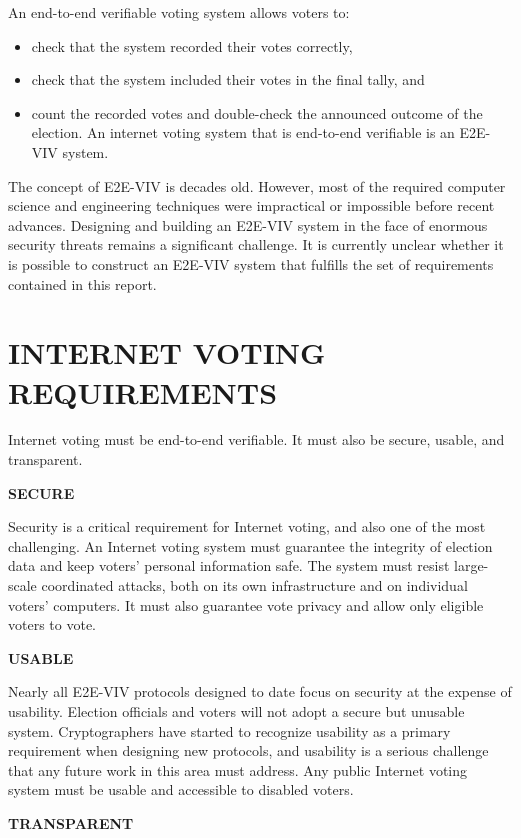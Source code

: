 An end-to-end verifiable voting system allows voters to:
\begin{itemize}
\item check that the system recorded their votes correctly,
\item check that the system included their votes in the final tally,
  and
\item count the recorded votes and double-check the announced outcome
  of the election. An internet voting system that is end-to-end
  verifiable is an E2E-VIV system.
\end{itemize}

The concept of E2E-VIV is decades old. However, most of the required
computer science and engineering techniques were impractical or
impossible before recent advances. Designing and building an E2E-VIV
system in the face of enormous security threats remains a significant
challenge. It is currently unclear whether it is possible to construct
an E2E-VIV system that fulfills the set of requirements contained in
this report.

\section*{INTERNET VOTING REQUIREMENTS}

Internet voting must be end-to-end verifiable. It must also be secure,
usable, and transparent.

\noindent \textbf{SECURE}

Security is a critical requirement for Internet voting, and also one
of the most challenging. An Internet voting system must guarantee the
integrity of election data and keep voters’ personal information
safe. The system must resist large-scale coordinated attacks, both on
its own infrastructure and on individual voters’ computers. It must
also guarantee vote privacy and allow only eligible voters to vote.

\noindent \textbf{USABLE}

Nearly all E2E-VIV protocols designed to date focus on security at the
expense of usability. Election officials and voters will not adopt a
secure but unusable system. Cryptographers have started to recognize
usability as a primary requirement when designing new protocols, and
usability is a serious challenge that any future work in this area
must address. Any public Internet voting system must be usable and
accessible to disabled voters.

\noindent \textbf{TRANSPARENT}

